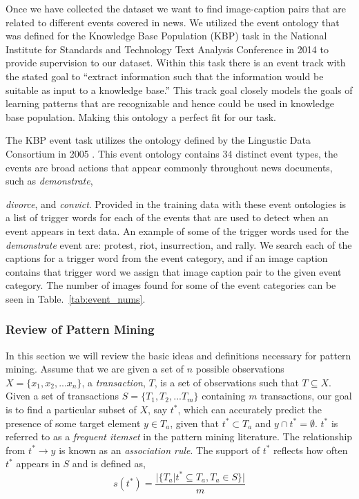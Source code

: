 \documentclass[10pt,twocolumn,letterpaper]{article}
\begin{document}
Once we have collected the dataset we want to find image-caption pairs that are related to different events covered in news.
We utilized the event ontology that was defined for the Knowledge Base Population (KBP) task in the National Institute for Standards and Technology Text Analysis Conference in 2014 to provide supervision to our dataset.
Within this task there is an event track with the stated goal to ``extract information such that the information would be suitable as input to a knowledge base.''
This track goal closely models the goals of learning patterns that are recognizable and hence could be used in knowledge base population.
Making this ontology a perfect fit for our task.

The KBP event task utilizes the ontology defined by the Lingustic Data Consortium in 2005 \cite{ACE}.
This event ontology contains 34 distinct event types, the events are broad actions that appear commonly throughout news documents, such as {\it demonstrate}, {{\it divorce}, and {\it convict}.
Provided in the training data with these event ontologies is a list of trigger words for each of the events that are used to detect when an event appears in text data.
An example of some of the trigger words used for the {\it demonstrate} event are: protest, riot, insurrection, and rally.
We search each of the captions for a trigger word from the event category, and if an image caption contains that trigger word we assign that image caption pair to the given event category.
The number of images found for some of the event categories can be seen in Table.~\ref{tab:event_nums}.

\subsubsection{Review of Pattern Mining}
\label{pattern_review}
In this section we will review the basic ideas and definitions necessary for pattern mining.
Assume that we are given a set of $n$ possible observations $X = \{ x_1, x_2, ... x_n \}$, a {\it transaction}, $T$, is a set of observations such that $T \subseteq X$.
Given a set of transactions $S = \{T_1, T_2, ... T_m\}$ containing $m$ transactions, our goal is to find a particular subset of $X$, say $t^*$, which can accurately predict the presence of some target element $y \in T_a$, given that $t^* \subset T_a$ and $y \cap t^* = \emptyset$.
$t^*$ is referred to as a {\it frequent itemset} in the pattern mining literature.
The relationship from $t^* \rightarrow y$ is known as an {\it association rule}.
The support of $t^*$ reflects how often $t^*$ appears in $S$ and is defined as,
\begin{equation}
s(t^*) = \frac{|\{T_{a} |t^* \subseteq T_{a},  T_{a} \in S \}|}{m}
\label{eq:st}
\end{equation}

}
\end{document}
